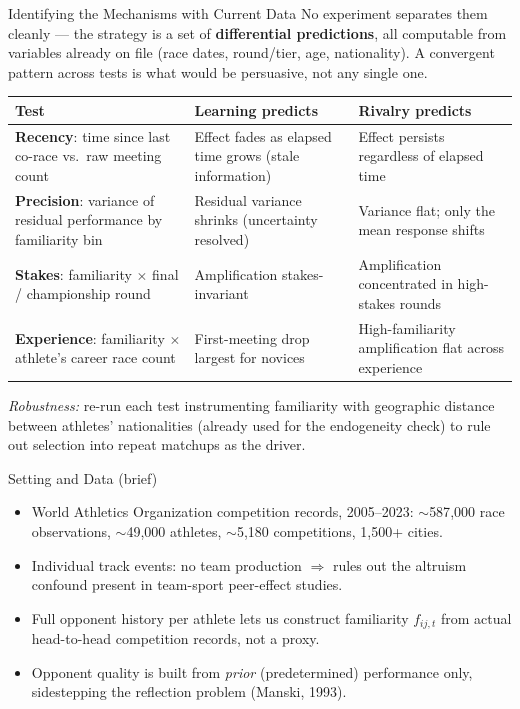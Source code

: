 \documentclass[11pt,aspectratio=169]{beamer}
\begin{document}
\begin{frame}{Identifying the Mechanisms with Current Data}
\scriptsize
No experiment separates them cleanly --- the strategy is a set of
\textbf{differential predictions}, all computable from variables already on
file (race dates, round/tier, age, nationality). A convergent pattern across
tests is what would be persuasive, not any single one.

\vspace{0.3em}
\begin{tabular}{@{}p{2.6cm}p{3.5cm}p{3.5cm}@{}}
\toprule
\textbf{Test} & \textbf{Learning predicts} & \textbf{Rivalry predicts} \\
\midrule
\textbf{Recency}: time since last co-race vs.\ raw meeting count &
Effect fades as elapsed time grows (stale information) &
Effect persists regardless of elapsed time \\[0.35em]
\textbf{Precision}: variance of residual performance by familiarity bin &
Residual variance shrinks (uncertainty resolved) &
Variance flat; only the mean response shifts \\[0.35em]
\textbf{Stakes}: familiarity $\times$ final / championship round &
Amplification stakes-invariant &
Amplification concentrated in high-stakes rounds \\[0.35em]
\textbf{Experience}: familiarity $\times$ athlete's career race count &
First-meeting drop largest for novices &
High-familiarity amplification flat across experience \\
\bottomrule
\end{tabular}

\vspace{0.3em}
\textit{Robustness:} re-run each test instrumenting familiarity with
geographic distance between athletes' nationalities (already used for the
endogeneity check) to rule out selection into repeat matchups as the driver.
\end{frame}

\begin{frame}{Setting and Data (brief)}
\begin{itemize}
    \item World Athletics Organization competition records, 2005--2023:
          $\sim$587{,}000 race observations, $\sim$49{,}000 athletes,
          $\sim$5{,}180 competitions, 1{,}500+ cities.
    \item Individual track events: no team production $\Rightarrow$
          rules out the altruism confound present in team-sport peer-effect
          studies.
    \item Full opponent history per athlete lets us construct familiarity
          $f_{ij,t}$ from actual head-to-head competition records, not a
          proxy.
    \item Opponent quality is built from \emph{prior} (predetermined)
          performance only, sidestepping the reflection problem
          (Manski, 1993).
\end{itemize}
\end{frame}
\end{document}
